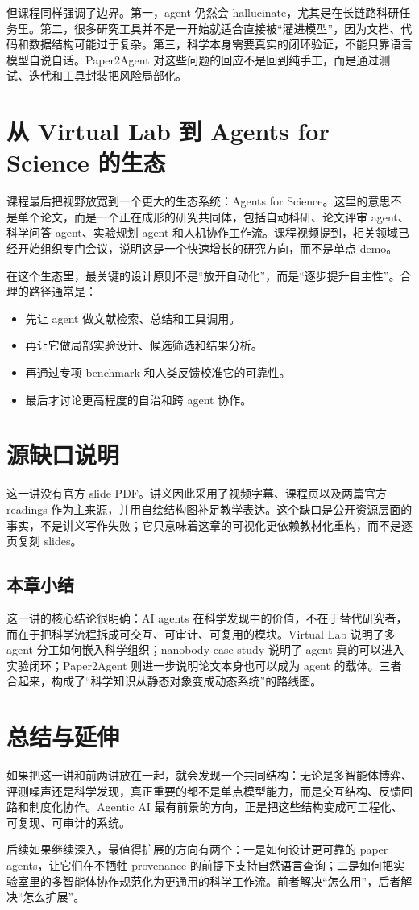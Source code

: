 \documentclass[a4paper,11pt]{article}
\begin{document}
但课程同样强调了边界。第一，agent 仍然会 hallucinate，尤其是在长链路科研任务里。第二，很多研究工具并不是一开始就适合直接被“灌进模型”，因为文档、代码和数据结构可能过于复杂。第三，科学本身需要真实的闭环验证，不能只靠语言模型自说自话。Paper2Agent 对这些问题的回应不是回到纯手工，而是通过测试、迭代和工具封装把风险局部化。

\section{从 Virtual Lab 到 Agents for Science 的生态}
课程最后把视野放宽到一个更大的生态系统：Agents for Science。这里的意思不是单个论文，而是一个正在成形的研究共同体，包括自动科研、论文评审 agent、科学问答 agent、实验规划 agent 和人机协作工作流。课程视频提到，相关领域已经开始组织专门会议，说明这是一个快速增长的研究方向，而不是单点 demo。

在这个生态里，最关键的设计原则不是“放开自动化”，而是“逐步提升自主性”。合理的路径通常是：
\begin{itemize}[leftmargin=1.4em]
  \item 先让 agent 做文献检索、总结和工具调用。
  \item 再让它做局部实验设计、候选筛选和结果分析。
  \item 再通过专项 benchmark 和人类反馈校准它的可靠性。
  \item 最后才讨论更高程度的自治和跨 agent 协作。
\end{itemize}

\section{源缺口说明}
这一讲没有官方 slide PDF。讲义因此采用了视频字幕、课程页以及两篇官方 readings 作为主来源，并用自绘结构图补足教学表达。这个缺口是公开资源层面的事实，不是讲义写作失败；它只意味着这章的可视化更依赖教材化重构，而不是逐页复刻 slides。

\subsection{本章小结}
这一讲的核心结论很明确：AI agents 在科学发现中的价值，不在于替代研究者，而在于把科学流程拆成可交互、可审计、可复用的模块。Virtual Lab 说明了多 agent 分工如何嵌入科学组织；nanobody case study 说明了 agent 真的可以进入实验闭环；Paper2Agent 则进一步说明论文本身也可以成为 agent 的载体。三者合起来，构成了“科学知识从静态对象变成动态系统”的路线图。

\section{总结与延伸}
如果把这一讲和前两讲放在一起，就会发现一个共同结构：无论是多智能体博弈、评测噪声还是科学发现，真正重要的都不是单点模型能力，而是交互结构、反馈回路和制度化协作。Agentic AI 最有前景的方向，正是把这些结构变成可工程化、可复现、可审计的系统。

后续如果继续深入，最值得扩展的方向有两个：一是如何设计更可靠的 paper agents，让它们在不牺牲 provenance 的前提下支持自然语言查询；二是如何把实验室里的多智能体协作规范化为更通用的科学工作流。前者解决“怎么用”，后者解决“怎么扩展”。
\end{document}
